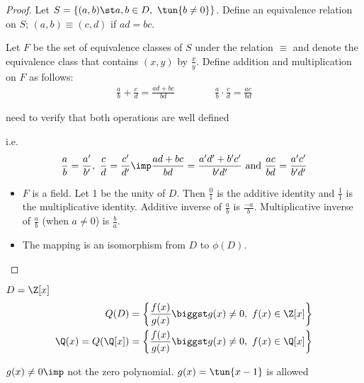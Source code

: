 \documentclass[a4paper]{article}
\begin{document}
\begin{proof}
  Let \( S = \{(a,b) \st a,b\in D,\ \tun{b\neq 0}\} \). Define an equivalence relation on \( S \); \( (a,b) \equiv (c,d) \) if \( ad = bc \).

  Let \( F \) be the set of equivalence classes of \( S \) under the relation \( \equiv \) and denote the equivalence class that contains \( (x,y) \) by \( \frac{x}{y} \). Define addition and multiplication on \( F \) as follows:
  \begin{align*}
    \frac{a}{b} + \frac{c}{d} = \frac{ad+bc}{bd} \qquad\qquad \frac{a}{b} \cdot \frac{c}{d} = \frac{ac}{bd}
  \end{align*}
  \begin{exercise}
    need to verify that both operations are well defined
  \end{exercise}
  i.e. \begin{align*}
    \frac{a}{b}=\frac{a'}{b'},\ \frac{c}{d} = \frac{c'}{d'} \imp \frac{ad+bc}{bd} = \frac{a'd'+b'c'}{b'd'} \text{ and } \frac{ac}{bd}=\frac{a'c'}{b'd'}
  \end{align*}
  \begin{itemize}
    \item \( F \) is a field. Let 1 be the unity of \( D \). Then \( \frac{0}{1} \) is the additive identity and \( \frac{1}{1} \) is the multiplicative identity. Additive inverse of \( \frac{a}{b} \) is \( \frac{-a}{b} \). Multiplicative inverse of \( \frac{a}{b} \) (when \( a\neq 0 \)) is \( \frac{b}{a} \).
    \item The mapping  is an isomorphism from \( D \) to \( \phi(D) \).
  \end{itemize}
\end{proof}

\begin{example}
  \( D=\Z[x] \)
\begin{align*}
  Q(D) &= \left\{\frac{f(x)}{g(x)}\biggst g(x)\neq 0,\ f(x)\in\Z[x]\right\} \\
  \Q(x) = Q(\Q[x]) &= \left\{\frac{f(x)}{g(x)}\biggst g(x)\neq 0,\ f(x)\in\Q[x]\right\}
\end{align*}
\begin{note}
  \( g(x)\neq 0 \imp \) not the zero polynomial. \( g(x) = \tun{x-1} \) is allowed
\end{note}
\end{example}
\end{document}
